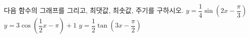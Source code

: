 다음 함수의 그래프를 그리고, 최댓값, 최솟값, 주기를 구하시오.
 $y=\dfrac{1}{4}\sin\left(2x-\dfrac{\pi}{3}\right)$
 $y=3\cos\left(\dfrac{1}{2}x-\pi\right)+1$
 $y=\dfrac{1}{2}\tan\left(3x-\dfrac{\pi}{2}\right)$
